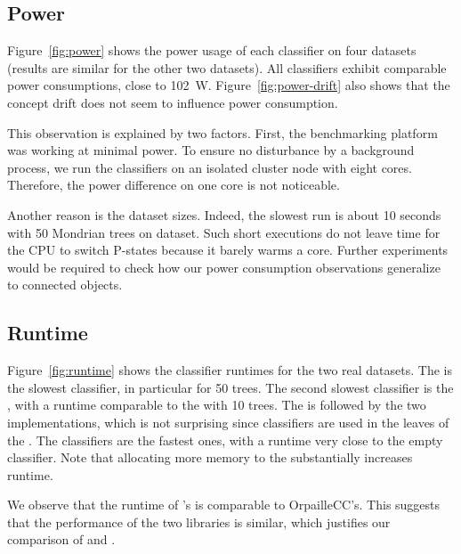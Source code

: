 \subsection{Power}
\label{sec:result-power}
Figure~\ref{fig:power} shows the power usage of each classifier on four
datasets (results are similar for the other two datasets). All classifiers exhibit comparable power consumptions, close to
102~W. Figure~\ref{fig:power-drift} also
shows that the concept drift does not seem to influence power consumption.

This observation is explained by two factors. First, the benchmarking
platform was  working at minimal power. To ensure no disturbance by a
background process, we run the classifiers on an isolated cluster node with
eight cores. Therefore, the power difference on one core is not noticeable.

Another reason is the dataset sizes. Indeed, the slowest run is about
10 seconds with 50 Mondrian trees on \recofitdataset dataset. Such short
executions do not leave time for the CPU to switch P-states because it
barely warms a core. Further experiments would be required to check how 
our power consumption observations generalize to 
connected objects. 

\subsection{Runtime}

Figure~\ref{fig:runtime} shows the classifier runtimes for the two real
datasets. The \mondrianforest is the slowest classifier, in particular for 50
trees. The second slowest classifier is the \hoeffdingtree, with a runtime
comparable to the \mondrianforest with 10 trees. The \hoeffdingtree is followed
by the two \naivebayes implementations, which is not surprising since
\naivebayes classifiers are used in the leaves of the \hoeffdingtree. The \mcnn
classifiers are the fastest ones, with a runtime very close to the empty
classifier. Note that allocating more memory to the \mondrianforest
substantially increases runtime.

We observe that the runtime of \streamdmcpp's \naivebayes is comparable to
OrpailleCC's. This suggests that the performance of the two libraries is
similar, which justifies our comparison of \hoeffdingtree and \mondrianforest.

